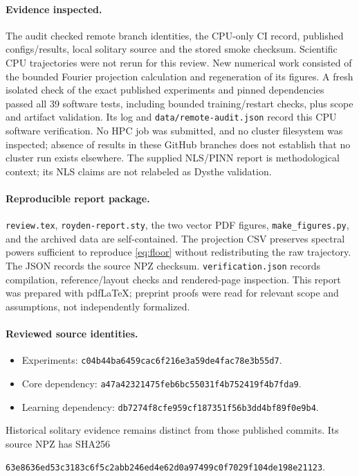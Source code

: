 \documentclass[11pt]{article}
\begin{document}
\paragraph{Evidence inspected.}
The audit checked remote branch identities, the CPU-only CI record, published
configs/results, local solitary source and the stored smoke checksum. Scientific
CPU trajectories were not rerun for this review. New numerical work consisted
of the bounded Fourier projection calculation and regeneration of its figures.
A fresh isolated check of the exact published experiments and pinned dependencies
passed all 39 software tests, including bounded training/restart checks, plus
scope and artifact validation. Its log and \texttt{data/remote-audit.json}
record this CPU software verification.
No HPC job was submitted, and no cluster filesystem was inspected; absence of
results in these GitHub branches does not establish that no cluster run exists
elsewhere. The supplied NLS/PINN report is methodological context; its NLS
claims are not relabeled as Dysthe validation.

\paragraph{Reproducible report package.}
\texttt{review.tex}, \texttt{royden-report.sty}, the two vector PDF figures,
\texttt{make\_figures.py}, and the archived data are self-contained. The projection
CSV preserves spectral powers sufficient to reproduce \eqref{eq:floor} without
redistributing the raw trajectory. The JSON records the source NPZ checksum.
\texttt{verification.json} records compilation, reference/layout checks and
rendered-page inspection. This report was prepared with pdfLaTeX; preprint proofs
were read for relevant scope and assumptions, not independently formalized.

\paragraph{Reviewed source identities.}
\begin{itemize}
\item Experiments: \texttt{c04b44ba6459cac6f216e3a59de4fac78e3b55d7}.
\item Core dependency: \texttt{a47a42321475feb6bc55031f4b752419f4b7fda9}.
\item Learning dependency: \texttt{db7274f8cfe959cf187351f56b3dd4bf89f0e9b4}.
\end{itemize}
Historical solitary evidence remains distinct from those published commits.
Its source NPZ has SHA256
\begin{center}\footnotesize
\texttt{63e8636ed53c3183c6f5c2abb246ed4e62d0a97499c0f7029f104de198e21123}.
\end{center}
\end{document}
